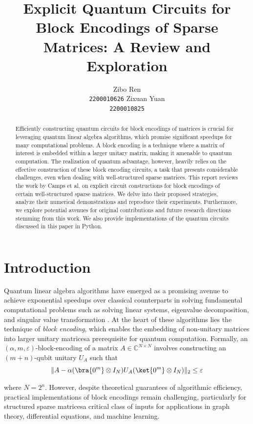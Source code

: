 \documentclass{article}
\title{Explicit Quantum Circuits for Block Encodings of Sparse Matrices: A Review and Exploration}
\author{%
    \large Zibo Ren \\
    \large \texttt{2200010626}
    \And
    \large Zixuan Yuan \\
    \large \texttt{2200010825}
}
\begin{document}
    \maketitle

    \begin{abstract}

        Efficiently constructing quantum circuits for block encodings of matrices is crucial for leveraging quantum linear algebra algorithms, which promise significant speedups for many computational problems.
        A block encoding is a technique where a matrix of interest is embedded within a larger unitary matrix, making it amenable to quantum computation.
        The realization of quantum advantage, however, heavily relies on the effective construction of these block encoding circuits, a task that presents considerable challenges, even when dealing with well-structured sparse matrices.
        This report reviews the work by Camps et al. \cite{EQC} on explicit circuit constructions for block encodings of certain well-structured sparse matrices.
        We delve into their proposed strategies, analyze their numerical demonstrations and reproduce their experiments.
        Furthermore, we explore potential avenues for original contributions and future research directions stemming from this work.
        We also provide implementations of the quantum circuits discussed in this paper in Python.

    \end{abstract}


    \section{Introduction}

    Quantum linear algebra algorithms have emerged as a promising avenue to achieve exponential speedups over classical counterparts in solving fundamental computational problems such as solving linear systems, eigenvalue decomposition, and singular value transformation \cite{EQC}. At the heart of these algorithms lies the technique of \emph{block encoding}, which enables the embedding of non-unitary matrices into larger unitary matrices\textemdash a prerequisite for quantum computation. Formally, an $(\alpha, m, \varepsilon)$-block-encoding of a matrix $A \in \mathbb{C}^{N \times N}$ involves constructing an $(m+n)$-qubit unitary $U_A$ such that
    $$\|A - \alpha(\bra{0^m} \otimes I_N)U_A(\ket{0^m} \otimes I_N)\|_2 \leq \varepsilon$$

    where $N=2^n$. However, despite theoretical guarantees of algorithmic efficiency, practical implementations of block encodings remain challenging, particularly for structured sparse matrices\textemdash a critical class of inputs for applications in graph theory, differential equations, and machine learning.
\end{document}
